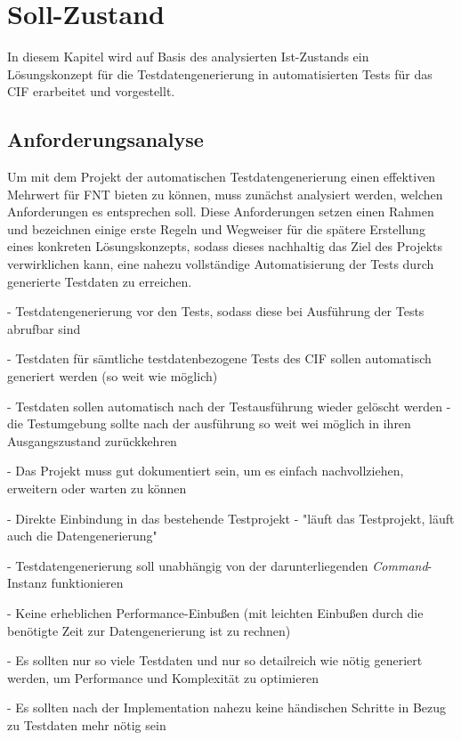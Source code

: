 \chapter{Soll-Zustand}\label{ch:sollzustand}
In diesem Kapitel wird auf Basis des analysierten Ist-Zustands ein Lösungskonzept für die Testdatengenerierung in automatisierten Tests für das \ac{CIF} erarbeitet und vorgestellt.

\section{Anforderungsanalyse}\label{sec:anforderungen}
Um mit dem Projekt der automatischen Testdatengenerierung einen effektiven Mehrwert für FNT bieten zu können, muss zunächst analysiert werden, welchen Anforderungen es entsprechen soll. Diese Anforderungen setzen einen Rahmen und bezeichnen einige erste Regeln und Wegweiser für die spätere Erstellung eines konkreten Lösungskonzepts, sodass dieses nachhaltig das Ziel des Projekts verwirklichen kann, eine nahezu vollständige Automatisierung der Tests durch generierte Testdaten zu erreichen.

- Testdatengenerierung vor den Tests, sodass diese bei Ausführung der Tests abrufbar sind

- Testdaten für sämtliche testdatenbezogene Tests des CIF sollen automatisch generiert werden (so weit wie möglich)

- Testdaten sollen automatisch nach der Testausführung wieder gelöscht werden - die Testumgebung sollte nach der ausführung so weit wei möglich in ihren Ausgangszustand zurückkehren

- Das Projekt muss gut dokumentiert sein, um es einfach nachvollziehen, erweitern oder warten zu können

- Direkte Einbindung in das bestehende Testprojekt - "läuft das Testprojekt, läuft auch die Datengenerierung"

- Testdatengenerierung soll unabhängig von der darunterliegenden \textit{Command}-Instanz funktionieren

- Keine erheblichen Performance-Einbußen (mit leichten Einbußen durch die benötigte Zeit zur Datengenerierung ist zu rechnen)

- Es sollten nur so viele Testdaten und nur so detailreich wie nötig generiert werden, um Performance und Komplexität zu optimieren

- Es sollten nach der Implementation nahezu keine händischen Schritte in Bezug zu Testdaten mehr nötig sein

